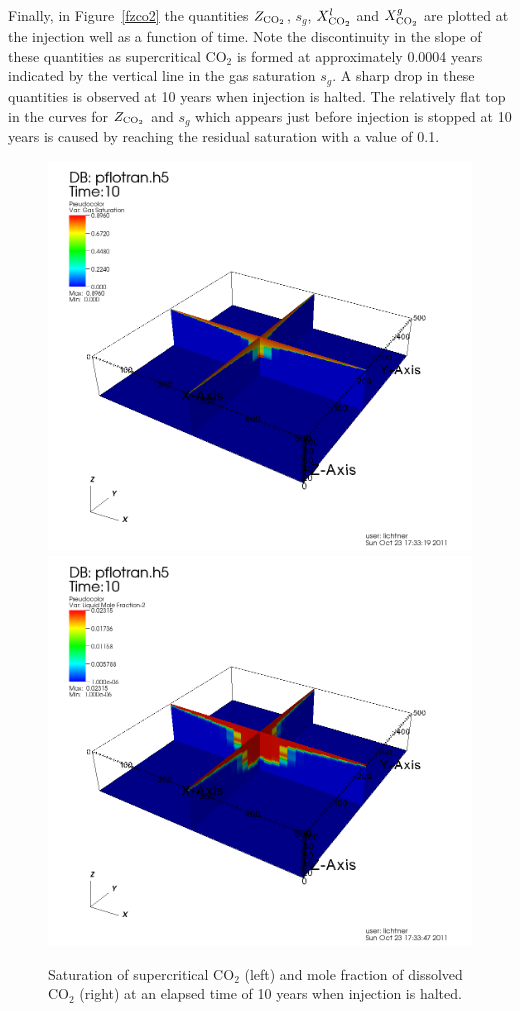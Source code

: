 \documentclass[12pt]{article}
\renewcommand{\c}{{\rm CO_2}}
\begin{document}
Finally, in Figure~\ref{fzco2} the quantities $Z_\c$, $s_g$, $X_\c^l$ and $X_\c^g$ are plotted at the injection well as a function of time. Note the discontinuity in the slope of these quantities as supercritical CO$_2$ is formed at approximately 0.0004 years indicated by the vertical line in the gas saturation $s_g$. A sharp drop in these quantities is observed at 10 years when injection is halted. The relatively flat top in the curves for $Z_\c$ and $s_g$ which appears just before injection is stopped at 10 years is caused by reaching the residual saturation with a value of 0.1.

\begin{figure}[h]
\includegraphics[scale=0.25]{./figs/sg-10y.png}
\includegraphics[scale=0.25]{./figs/xlco2-10y.png}
\caption{Saturation of supercritical CO$_2$ (left) and mole fraction of dissolved CO$_2$ (right) at an elapsed time of 10 years when injection is halted.}\label{f10y}
\end{figure}
\end{document}
